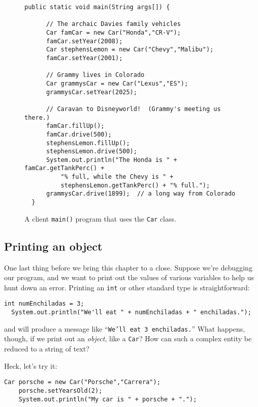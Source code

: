 \begin{figure}[h]
\centering
\begin{Verbatim}[samepage=true,fontsize=\footnotesize,frame=single]
  public static void main(String args[]) {
  
      // The archaic Davies family vehicles
      Car famCar = new Car("Honda","CR-V");
      famCar.setYear(2008);
      Car stephensLemon = new Car("Chevy","Malibu");
      famCar.setYear(2001);
  
      // Grammy lives in Colorado
      Car grammysCar = new Car("Lexus","ES");
      grammysCar.setYear(2025);
  
      // Caravan to Disneyworld!  (Grammy's meeting us there.)
      famCar.fillUp();
      famCar.drive(500);
      stephensLemon.fillUp();
      stephensLemon.drive(500);
      System.out.println("The Honda is " + famCar.getTankPerc() + 
          "% full, while the Chevy is " +
          stephensLemon.getTankPerc() + "% full.");
      grammysCar.drive(1899);  // a long way from Colorado
  }
\end{Verbatim}
\caption{A client \texttt{main()} program that uses the \texttt{Car} class.}
\label{fig:wholeNewWorld}
\end{figure}


\subsection{Printing an object}

One last thing before we bring this chapter to a close. Suppose we're
debugging our program, and we want to print out the values of various
variables to help us hunt down an error. Printing an \texttt{int} or other
standard type is straightforward:

\begin{Verbatim}[samepage=true,fontsize=\scriptsize,frame=single]
  int numEnchiladas = 3;
  System.out.println("We'll eat " + numEnchiladas + " enchiladas.");
\end{Verbatim}

and will produce a message like ``\texttt{We'll eat 3 enchiladas.}'' What
happens, though, if we print out an \textit{object}, like a \texttt{Car}? How
can such a complex entity be reduced to a string of text?

Heck, let's try it:

\begin{Verbatim}[samepage=true,fontsize=\scriptsize,frame=single]
    Car porsche = new Car("Porsche","Carrera");
    porsche.setYearsOld(2);
    System.out.println("My car is " + porsche + ".");
\end{Verbatim}

